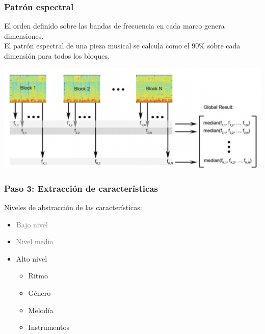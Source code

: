 \documentclass[
10pt, %
aspectratio=169, %
]{beamer}
\begin{document}
	\begin{frame}
		
		\frametitle{Patrón espectral}
		
			El orden definido sobre las bandas de frecuencia en cada marco genera dimensiones. \\[2mm]
			
			El patrón espectral de una pieza musical se calcula como el $90\%$ sobre cada dimensión para todos los bloques. 
						
			\vspace{2\baselineskip}
			
			\centering
			\includegraphics[scale=0.4]{patron-espectral.png}
			
	\end{frame}
	
	\begin{frame}
		
		\frametitle{Paso 3: Extracción de características}
		
		Niveles de abstracción de las características:
		\begin{itemize}
			\item \textcolor{gray}{Bajo nivel}
		
			\item \textcolor{gray}{Nivel medio}
			
			\item Alto nivel
			
			\begin{itemize}
				\item Ritmo
				\item Género
				\item Melodía
				\item Instrumentos
			\end{itemize}
			
		\end{itemize}
		
	\end{frame}
	
\end{document}
